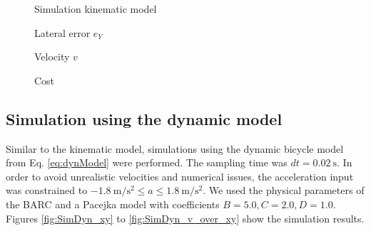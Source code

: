 \begin{figure}[ht]
	\centering
  	
	\caption{Simulation kinematic model} %
	\label{fig:SimKin_xy}
\end{figure}

\begin{figure}[ht]
	\centering
  	
  	\caption{Lateral error $e_Y$}
	\label{fig:SimKin_eY}
\end{figure}

\begin{figure}[ht]
	\centering
  	
  	\caption{Velocity $v$}
	\label{fig:SimKin_v}
\end{figure}

\begin{figure}[ht]
	\centering
  	
  	\caption{Cost}
	\label{fig:SimKin_cost}
\end{figure}
\subsection{Simulation using the dynamic model}
Similar to the kinematic model, simulations using the dynamic bicycle model from Eq. \eqref{eq:dynModel} were performed. The sampling time was $dt=\SI{0.02}{\second}$. In order to avoid unrealistic velocities and numerical issues, the acceleration input was constrained to $-\SI{1.8}{\meter\per\square\second}\leq a \leq \SI{1.8}{\meter\per\square\second}$. We used the physical parameters of the BARC and a Pacejka model with coefficients $B=5.0, C=2.0, D = 1.0$. Figures \ref{fig:SimDyn_xy} to \ref{fig:SimDyn_v_over_xy} show the simulation results.\\
